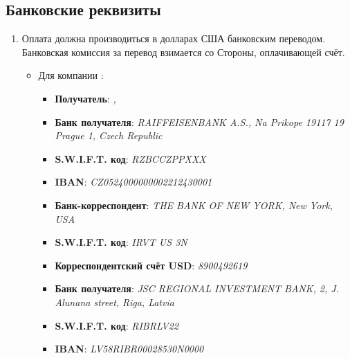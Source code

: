 \begin{Form}
    \section{Банковские реквизиты}%
        \begin{enumerate}[label=\thesection.\arabic*.]
          \item  Оплата должна производиться в долларах США банковским переводом. Банковская комиссия за перевод взимается со Стороны,
                оплачивающей счёт.
                \begin{itemize}
                 \item Для компании \textbf{\ipxpname}:
                    \begin{itemize}
                      \item \textbf{Получатель}: \textit{\ipxpname, \ipxpaddress}
                      \bigskip
                    \end{itemize}
                    \begin{itemize}
                      \item \textbf{Банк получателя}: \textit{RAIFFEISENBANK A.S., Na Prikope 19117 19 Prague 1, Czech Republic}
                      \item \textbf{S.W.I.F.T. код}: \textit{RZBCCZPPXXX}
                      \item \textbf{IBAN}:  \textit{CZ0524000000002212430001}
                    \end{itemize}
                    \begin{itemize}
                      \item \textbf{Банк-корреспондент}: \textit{THE BANK OF NEW YORK, New York, USA}
                      \item \textbf{S.W.I.F.T. код}: \textit{IRVT US 3N}
                      \item \textbf{Корреспондентский счёт USD}: \textit{8900492619}
                      \bigskip
                    \end{itemize}
                    \begin{itemize}
                      \item \textbf{Банк получателя}: \textit{JSC \flqq{}REGIONAL INVESTMENT BANK\frqq{}, 2, J. Alunana street, Riga, Latvia}
                      \item \textbf{S.W.I.F.T. код}: \textit{RIBRLV22}
                      \item \textbf{IBAN}:   \textit{LV58RIBR00028530N0000}

\end{itemize}
\end{itemize}
\end{enumerate}
\end{Form}
